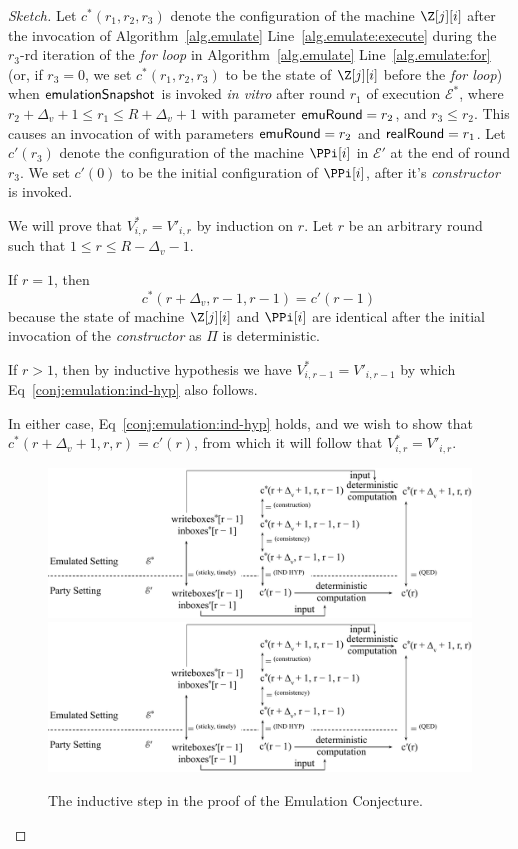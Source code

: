 \begin{proof}[Sketch]
  Let $c^*(r_1, r_2, r_3)$ denote the configuration
  of the machine $\Z[j][i]$ after the invocation of
  Algorithm~\ref{alg.emulate} Line~\ref{alg.emulate:execute}
  during the $r_3$-rd iteration of the \emph{for loop} in
  Algorithm~\ref{alg.emulate} Line~\ref{alg.emulate:for}
  (or, if $r_3 = 0$, we set $c^*(r_1, r_2, r_3)$ to be the state of
  $\Z[j][i]$ before the \emph{for loop})
  when $\textsf{emulationSnapshot}$ is
  invoked \emph{in vitro} after round $r_1$ of execution $\mathcal{E}^*$,
  where $r_2 + \Delta_v + 1 \leq r_1 \leq R + \Delta_v + 1$ with parameter
  $\textsf{emuRound} = r_2$, and $r_3 \leq r_2$.
  This causes an invocation of \emulate with parameters
  $\textsf{emuRound} = r_2$ and $\textsf{realRound} = r_1$.
  Let $c'(r_3)$ denote the configuration of the machine $\PPi[i]$
  in $\mathcal{E}'$ at the end of round $r_3$.
  We set $c'(0)$ to be the initial configuration of $\PPi[i]$,
  after it's \emph{constructor} is invoked.

  We will prove that $V^*_{i,r} = V'_{i,r}$ by induction on $r$.
  Let $r$ be an arbitrary round such that $1 \leq r \leq R - \Delta_v - 1$.

  If $r = 1$, then
  \begin{equation}\label{conj:emulation:ind-hyp}
    c^*(r + \Delta_v, r - 1, r - 1) = c'(r - 1)\,
  \end{equation}
  because the state of machine $\Z[j][i]$ and $\PPi[i]$ are identical
  after the initial invocation of the \emph{constructor} as $\Pi$
  is deterministic.

  If $r > 1$, then by inductive hypothesis we have $V^*_{i,r - 1} = V'_{i,r - 1}$
  by which Eq~\ref{conj:emulation:ind-hyp} also follows.

  In either case, Eq~\ref{conj:emulation:ind-hyp} holds, and we
  wish to show that $c^*(r + \Delta_v + 1, r, r) = c'(r)$,
  from which it will follow that $V^*_{i,r} = V'_{i,r}$.

  \begin{figure}
    \centering
    \iftwocolumn
    \includegraphics[width=0.6 \textwidth,keepaspectratio]{figures/emulation-claim-1-induction.pdf}
    \else
    \includegraphics[width=\textwidth,keepaspectratio]{figures/emulation-claim-1-induction.pdf}
    \fi
    \caption{The inductive step in the proof of the Emulation Conjecture.}
    \label{fig.emulation-claim-1-induction}
  \end{figure}


\end{proof}
